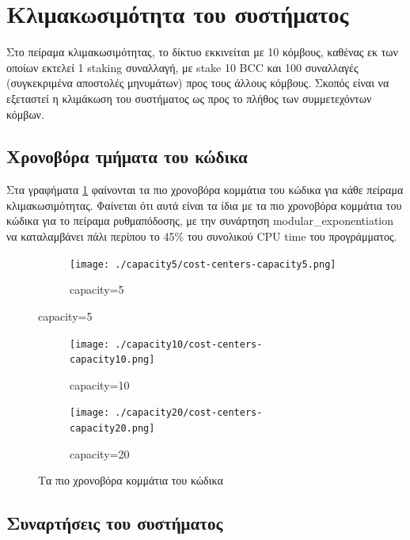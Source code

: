 \documentclass{article}
\newcommand{\eng}[1]{\foreignlanguage{english}{#1}} %
\begin{document}
\clearpage
\section{Κλιμακωσιμότητα του συστήματος}

Στο πείραμα κλιμακωσιμότητας, το δίκτυο εκκινείται με 10 κόμβους, καθένας εκ
των οποίων εκτελεί 1 \eng{staking} συναλλαγή, με \eng{stake 10 BCC} και 100
συναλλαγές (συγκεκριμένα αποστολές μηνυμάτων) προς τους άλλους κόμβους. Σκοπός
είναι να εξεταστεί η κλιμάκωση του συστήματος ως προς το πλήθος των
συμμετεχόντων κόμβων.

\subsection{Χρονοβόρα τμήματα του κώδικα}

Στα γραφήματα \ref{fig:scalability-cost-centers} φαίνονται τα πιο χρονοβόρα
κομμάτια του κώδικα για κάθε πείραμα κλιμακωσιμότητας. Φαίνεται ότι αυτά είναι
τα ίδια με τα πιο χρονοβόρα κομμάτια του κώδικα για το πείραμα ρυθμαπόδοσης, με
την συνάρτηση \eng{modular\_exponentiation} να καταλαμβάνει πάλι περίπου το
45\% του συνολικού \eng{CPU time} του προγράμματος.

\graphicspath{{../experiments/profiled\_outputs/docker/scalability/}}

\begin{figure}[ht]
    \centering
    \begin{subfigure}{\textwidth}
        \texttt{[image: ./capacity5/cost-centers-capacity5.png]}
        \caption{\eng{capacity=5}}
    \end{subfigure}
\end{figure}
\begin{figure}[ht]
    \ContinuedFloat
    \begin{subfigure}{\textwidth}
        \texttt{[image: ./capacity10/cost-centers-capacity10.png]}
        \caption{\eng{capacity=10}}
    \end{subfigure}
    \begin{subfigure}{\textwidth}
        \texttt{[image: ./capacity20/cost-centers-capacity20.png]}
        \caption{\eng{capacity=20}}
    \end{subfigure}
    \caption{Τα πιο χρονοβόρα κομμάτια του κώδικα}
    \label{fig:scalability-cost-centers}
\end{figure}
\FloatBarrier

\subsection{Συναρτήσεις του συστήματος}
\end{document}
